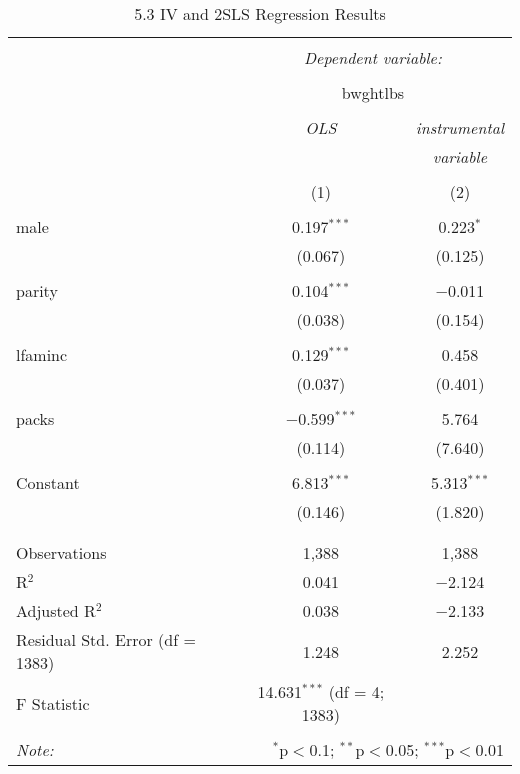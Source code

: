 \documentclass[11pt]{article} %
\begin{document}
\begin{table}[!htbp] \centering 
	\caption{5.3 IV and 2SLS Regression Results} 
	\label{5.3::partc} 
  \begin{tabular}{@{\extracolsep{5pt}}lcc} 
  \\[-1.8ex]\hline 
  \hline \\[-1.8ex] 
   & \multicolumn{2}{c}{\textit{Dependent variable:}} \\ 
  \cline{2-3} 
  \\[-1.8ex] & \multicolumn{2}{c}{bwghtlbs} \\ 
  \\[-1.8ex] & \textit{OLS} & \textit{instrumental} \\ 
   & \textit{} & \textit{variable} \\ 
  \\[-1.8ex] & (1) & (2)\\ 
  \hline \\[-1.8ex] 
   male & 0.197$^{***}$ & 0.223$^{*}$ \\ 
	& (0.067) & (0.125) \\ 
	& & \\ 
   parity & 0.104$^{***}$ & $-$0.011 \\ 
	& (0.038) & (0.154) \\ 
	& & \\ 
   lfaminc & 0.129$^{***}$ & 0.458 \\ 
	& (0.037) & (0.401) \\ 
	& & \\ 
   packs & $-$0.599$^{***}$ & 5.764 \\ 
	& (0.114) & (7.640) \\ 
	& & \\ 
   Constant & 6.813$^{***}$ & 5.313$^{***}$ \\ 
	& (0.146) & (1.820) \\ 
	& & \\ 
  \hline \\[-1.8ex] 
  Observations & 1,388 & 1,388 \\ 
  R$^{2}$ & 0.041 & $-$2.124 \\ 
  Adjusted R$^{2}$ & 0.038 & $-$2.133 \\ 
  Residual Std. Error (df = 1383) & 1.248 & 2.252 \\ 
  F Statistic & 14.631$^{***}$ (df = 4; 1383) &  \\ 
  \hline 
  \hline \\[-1.8ex] 
  \textit{Note:}  & \multicolumn{2}{r}{$^{*}$p$<$0.1; $^{**}$p$<$0.05; $^{***}$p$<$0.01} \\ 
  \end{tabular} 
  \end{table} 
\end{document}
